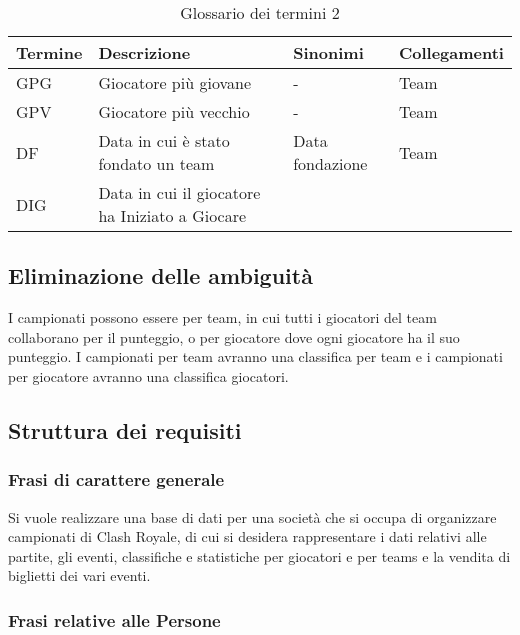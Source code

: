 \documentclass{article}
\begin{document}
\begin{table}[H]
\centering
\begin{tabularx}{\textwidth}{|l|X|l|X|}
\hline
\textbf{Termine}   & \textbf{Descrizione} & \textbf{Sinonimi} & \textbf{Collegamenti} \\ \hline
GPG & Giocatore più giovane & - & Team \\ \hline
GPV & Giocatore più vecchio & - & Team \\ \hline
DF & Data in cui è stato fondato un team & Data fondazione  & Team \\ \hline
DIG & Data in cui il giocatore ha Iniziato a Giocare & & \\ \hline
\end{tabularx}
\caption{Glossario dei termini 2}
\label{table_glossario_termini2}
\end{table}


\subsection{Eliminazione delle ambiguità}

I campionati possono essere per team, in cui tutti i giocatori del team collaborano per il punteggio, o per giocatore dove ogni giocatore ha il suo punteggio. I campionati per team avranno una classifica per team e i campionati per giocatore avranno una classifica giocatori.

\subsection{Struttura dei requisiti}

\subsubsection{Frasi di carattere generale}

Si vuole realizzare una base di dati per una società che si occupa di organizzare campionati di Clash Royale, di cui si desidera rappresentare i dati relativi alle partite, gli eventi, classifiche e statistiche per giocatori e per teams e la vendita di biglietti dei vari eventi.

\subsubsection{Frasi relative alle Persone}
\end{document}
